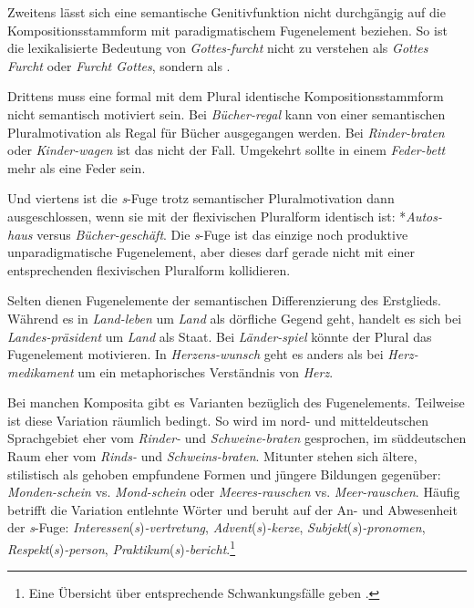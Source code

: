 Zweitens lässt sich eine semantische Genitivfunktion nicht durchgängig auf die Kompositionsstammform mit paradigmatischem Fugenelement beziehen. So ist \zB die lexikalisierte Bedeutung von \textit{Gottes-furcht} nicht zu verstehen als \textit{Gottes Furcht} oder \textit{Furcht Gottes}, sondern als . 

Drittens muss eine formal mit dem Plural identische Kompositionsstammform nicht semantisch motiviert sein. Bei \textit{Bücher-regal} kann von einer semantischen Pluralmotivation als Regal für Bücher ausgegangen werden. Bei \textit{Rinder-braten} oder \textit{Kinder-wagen} ist das nicht der Fall. Umgekehrt sollte in einem \textit{Feder-bett} mehr als eine Feder sein. 

Und viertens ist die \textit{s}-Fuge trotz semantischer Pluralmotivation dann ausgeschlossen, wenn sie mit der flexivischen Pluralform identisch ist: *\textit{Autos-haus} versus \textit{Bücher-geschäft}. Die \textit{s}-Fuge ist das einzige noch produktive unparadigmatische Fugenelement, aber dieses darf gerade nicht mit einer entsprechenden flexivischen Pluralform kollidieren.

Selten dienen Fugenelemente der semantischen Differenzierung des Erstglieds. Während es in \textit{Land-leben} um \textit{Land} als dörfliche Gegend geht, handelt es sich bei \textit{Landes-präsident} um \textit{Land} als Staat. Bei \textit{Länder-spiel} könnte der Plural das Fugenelement motivieren. In \textit{Herzens-wunsch} geht es anders als bei \textit{Herz-medikament} um ein metaphorisches Verständnis von \textit{Herz}. 

Bei manchen Komposita gibt es Varianten bezüglich des Fugenelements. Teilweise ist diese Variation räumlich bedingt. So wird im nord- und mitteldeutschen Sprachgebiet eher vom \textit{Rinder-} und \textit{Schweine-braten} gesprochen, im süddeutschen Raum eher vom \textit{Rinds-} und \textit{Schweins-braten}. Mitunter stehen sich ältere, stilistisch als gehoben empfundene Formen und jüngere Bildungen gegenüber: \textit{Monden-schein} vs. \textit{Mond-schein} oder \textit{Meeres-rauschen} vs. \textit{Meer-rauschen}. Häufig betrifft die Variation entlehnte Wörter und beruht auf der An- und Abwesenheit der \textit{s}-Fuge: \textit{Interessen}(\textit{s})\textit{-vertretung}, \textit{Advent}(\textit{s})\textit{-kerze}, \textit{Subjekt}(\textit{s})\textit{-pronomen}, \textit{Respekt}(\textit{s})\textit{-person}, \textit{Praktikum}(\textit{s})\textit{-bericht}.\footnote{Eine Übersicht über entsprechende Schwankungsfälle geben \citet[217--219]{NueblingSzczep2009}.}

